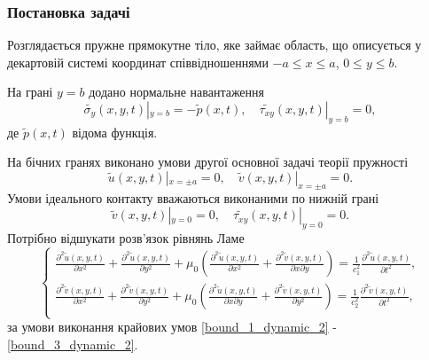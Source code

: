 \subsubsection{Постановка задачі}
Розглядається пружне прямокутне тіло, яке займає область,
що описується у декартовій системі координат співвідношеннями $-a \le x \le a$, $0 \le y \le b$.

На грані $y=b$ додано нормальне навантаження
\begin{equation}\label{bound_1_dynamic_2}
    \widetilde{\sigma_y}(x, y, t) |_{y=b} = -\widetilde{p}(x, t), \quad  \widetilde{\tau_{xy}}(x,y,t) |_{y=b} =0,
\end{equation}
де $\widetilde{p}(x,t)$ відома функція.

На бічних гранях виконано умови другої основної задачі теорії пружності
\begin{equation}\label{bound_2_dynamic_2}
    \widetilde{u}(x,y,t) |_{x=\pm a} = 0, \quad  \widetilde{v}(x,y,t) |_{x=\pm a} =0.
\end{equation}
Умови ідеального контакту вважаються виконаними по нижній грані
\begin{equation}\label{bound_3_dynamic_2}
    \widetilde{v}(x,y,t) |_{y=0} = 0, \quad \widetilde{\tau_{xy}}(x,y,t) |_{y=0} =0.
\end{equation}
Потрібно відшукати розв'язок рівнянь Ламе
\begin{equation}
    \begin{cases}
        \frac{\partial^2  \widetilde{u}(x,y,t)}{\partial x^2} + \frac{\partial^2  \widetilde{u}(x,y,t)}{\partial y^2} + \mu_0 (\frac{\partial^2  \widetilde{u}(x,y,t)}{\partial x^2} + \frac{\partial^2  \widetilde{v}(x,y,t)}{\partial x\partial y}) = \frac{1}{c_1^2} \frac{\partial^2  \widetilde{u}(x,y,t)}{\partial t^2}, \\
        \frac{\partial^2  \widetilde{v}(x,y,t)}{\partial x^2} + \frac{\partial^2  \widetilde{v}(x,y,t)}{\partial y^2} + \mu_0 (\frac{\partial^2  \widetilde{u}(x,y,t)}{\partial x \partial y} + \frac{\partial^2  \widetilde{v}(x,y,t)}{\partial y^2}) = \frac{1}{c_2^2} \frac{\partial^2  \widetilde{v}(x,y,t)}{\partial t^2}, \\
    \end{cases}
\end{equation}
за умови виконання крайових умов \eqref{bound_1_dynamic_2} - \eqref{bound_3_dynamic_2}.

